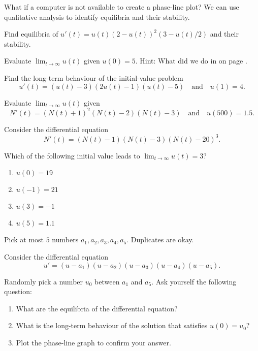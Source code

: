 \documentclass[../main.tex]{subfiles}
\begin{document}
What if a computer is not available to create a phase-line plot? We can use qualitative analysis to identify equilibria and their stability.

\begin{example}
  Find equilibria of \(u'(t) = u(t) ( 2 - u(t) )^{2} (3 - u(t)/2)\) and their stability.


  Evaluate \(\lim_{t \to \infty} u(t)\) given \(u(0) = 5\).  Hint: What did we do in \faStar{} on page \pageref{eq:diff-eq-logistic-equation-equilibria}.
\end{example}
\clearpage

\begin{example}
  Find the long-term behaviour of the initial-value problem 
  \[
    u'(t) = (u(t) - 3) (2u(t) - 1) (u(t) - 5) \quad\text{and}\quad u(1) = 4.
  \]
\end{example}


\begin{example}
  Evaluate \(\lim_{t \to \infty} u(t)\) given
  \[
    N'(t) = (N(t) + 1)^{2} (N(t) - 2) (N(t) - 3) \quad\text{and}\quad u(500) = 1.5.
  \]
\end{example}

\begin{example}
  Consider the differential equation
  \[
    N'(t) = (N(t) - 1) (N(t) - 3) (N(t) - 20)^{3}.
  \]

  Which of the following initial value leads to \(\lim_{t \to \infty} u(t) = 3\)?
  \begin{enumerate}[label=(\alph*)]
    \item \(u(0) = 19\)
    \item \(u(-1) = 21\)
    \item \(u(3) = -1\)
    \item \(u(5) = 1.1\)
  \end{enumerate}
\end{example}

\begin{example}
  Pick at most \(5\) numbers \(a_{1}, a_{2}, a_{3}, a_{4}, a_{5}\). Duplicates are okay.

  Consider the differential equation
  \[
    u' = (u - a_{1}) (u - a_{2})(u - a_{3})(u - a_{4})(u - a_{5}).
  \]

  Randomly pick a number \(u_{0}\) between \(a_{1}\) and \(a_{5}\).  Ask yourself the following question:
  \begin{enumerate}
    \item What are the equilibria of the differential equation?
    \item What is the long-term behaviour of the solution that satisfies \(u(0) = u_{0}\)?
    \item Plot the phase-line graph to confirm your answer.
  \end{enumerate}
\end{example}
\end{document}
